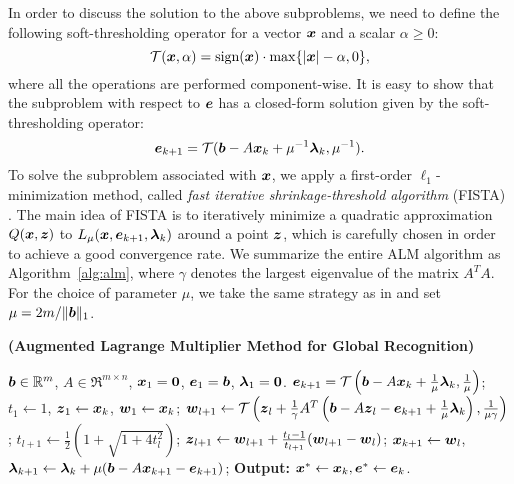 In order to discuss the solution to the above subproblems, we
need to define the following soft-thresholding operator for a
vector ${\boldsymbol{x}}$ and a scalar $\alpha \geq 0$:
\begin{equation}
\mathcal{T}({\boldsymbol{x}},\alpha) = \textup{sign}({\boldsymbol{x}})\cdot \max \{|{\boldsymbol{x}}| - \alpha, 0\},
\end{equation}
where all the operations are performed component-wise. It is
easy to show that the subproblem with respect to $\boldsymbol{e}$ has a
closed-form solution given by the soft-thresholding operator:
\begin{equation}
\boldsymbol{e}_{k+1} = \mathcal{T}(\boldsymbol{b} - A{\boldsymbol{x}}_k + \mu^{-1}\boldsymbol{\lambda}_k, \mu^{-1}).
\end{equation}
To solve the subproblem associated with ${\boldsymbol{x}}$, we
apply a first-order $\ell_1$-minimization method,
called \emph{fast iterative shrinkage-threshold algorithm}
(FISTA) \cite{BeckA2009}. The main idea of FISTA is to
iteratively minimize a quadratic approximation $Q({\boldsymbol{x}}, \boldsymbol{z})$ to
$L_{\mu} ({\boldsymbol{x}},\boldsymbol{e}_{k+1},\boldsymbol{\lambda}_k)$ around a point $\boldsymbol{z}$, which is
carefully chosen in order to achieve a good convergence
rate. We summarize the entire ALM
algorithm as Algorithm~\ref{alg:alm}, where $\gamma$ denotes the
largest eigenvalue of the matrix $A^TA$. For the choice of parameter $\mu$, we take the same strategy as
in \cite{YangJ2009-pp} and set $\mu = 2m / \|\boldsymbol{b}\|_1$.

\begin{algorithm}[t]
\caption{\bf (Augmented Lagrange Multiplier Method for Global
Recognition)}
\begin{algorithmic}[1]
\begin{small}
 $\boldsymbol{b} \in \mathbb R^m$, $A \in \Re^{m \times n}$,
${\boldsymbol{x}}_1 = \boldsymbol{0}$, $\boldsymbol{e}_1 = \boldsymbol{b}$, $\boldsymbol{\lambda}_1 =
\boldsymbol{0}$.
\STATE $\boldsymbol{e}_{k+1} = \mathcal{T}\left(\boldsymbol{b} - A{\boldsymbol{x}}_k +
\frac{1}{\mu}\boldsymbol{\lambda}_k, \frac{1}{\mu}\right)$;
\STATE $t_1\leftarrow 1$, $\boldsymbol{z}_1 \leftarrow {\boldsymbol{x}}_k$, $\boldsymbol{w}_1 \leftarrow {\boldsymbol{x}}_k$;
\STATE $\boldsymbol{w}_{l+1} \leftarrow \mathcal{T}\left(\boldsymbol{z}_l +
\frac{1}{\gamma}A^T\left(\boldsymbol{b} - A\boldsymbol{z}_l - \boldsymbol{e}_{k+1} +
\frac{1}{\mu}\boldsymbol{\lambda}_k\right), \frac{1}{\mu\gamma}\right)$;
\STATE $t_{l+1} \leftarrow \frac{1}{2}\left( 1 +
\sqrt{1+4t_l^2}\right)$;
\STATE $\boldsymbol{z}_{l+1} \leftarrow \boldsymbol{w}_{l+1} + \frac{t_l - 1}{t_{l+1}}(\boldsymbol{w}_{l+1} - \boldsymbol{w}_l)$;
\ENDWHILE
\STATE ${\boldsymbol{x}}_{k+1} \leftarrow \boldsymbol{w}_{l}$,  \; $\boldsymbol{\lambda}_{k+1} \leftarrow \boldsymbol{\lambda}_k + \mu (\boldsymbol{b} - A{\boldsymbol{x}}_{k+1} - \boldsymbol{e}_{k+1})$;
\ENDWHILE \STATE
{\bf Output:} ${\boldsymbol{x}}^* \leftarrow {\boldsymbol{x}}_k, \boldsymbol{e}^* \leftarrow \boldsymbol{e}_k$.
\end{small}
\end{algorithmic}
\label{alg:alm}
\end{algorithm}


